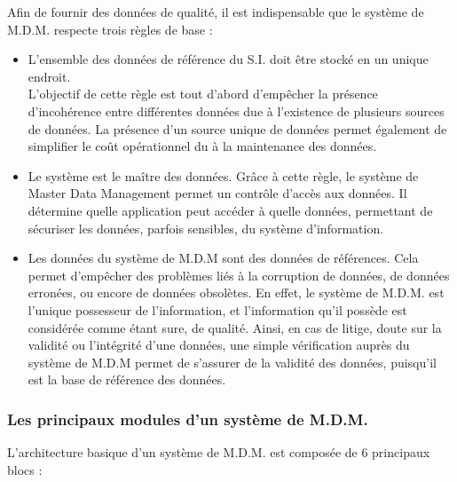 Afin de fournir des données de qualité, il est indispensable que le système de M.D.M. respecte trois règles de base :

\begin{itemize}

\item
L'ensemble des données de référence du S.I. doit être stocké en un unique endroit.\\
L'objectif de cette règle est tout d'abord d'empêcher la présence d'incohérence entre différentes données due à l'existence de plusieurs sources de données. La présence d'un source unique de données permet également de simplifier le coût opérationnel du à la maintenance des données.

\item
Le système est le maître des données. Grâce à cette règle, le système de Master Data Management permet un contrôle d'accès aux données. Il détermine quelle application peut accéder à quelle données, permettant de sécuriser les données, parfois sensibles, du système d'information.

\item Les données du système de M.D.M sont des données de références. Cela permet d'empêcher des problèmes liés à la corruption de données, de données erronées, ou encore de données obsolètes. En effet, le système de M.D.M. est l'unique possesseur de l'information, et l'information qu'il possède est considérée comme étant sure, de qualité. Ainsi, en cas de litige, doute sur la validité ou l'intégrité d'une données, une simple vérification auprès du système de M.D.M permet de s'assurer de la validité des données, puisqu'il est la base de référence des données.

\end{itemize}

\subsubsection{Les principaux modules d'un système de M.D.M.}

L'architecture basique d'un système de M.D.M. est composée de 6 principaux blocs :

